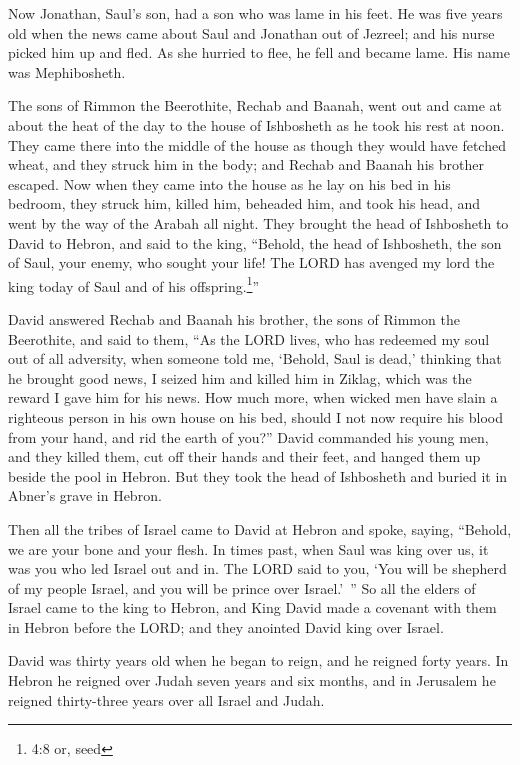 \myverse{}Now Jonathan, Saul’s son, had a son who was lame in his feet. He
was five years old when the news came about Saul and Jonathan out of Jezreel; and his nurse picked him
up and fled. As she hurried to flee, he fell and became lame. His name was Mephibosheth.

\myverse{}The sons of Rimmon the Beerothite, Rechab and Baanah, went out
and came at about the heat of the day to the house of Ishbosheth as he took his rest at noon.
\myverse{}They came there into the middle of the house as though they would have fetched
wheat, and they struck him in the body; and Rechab and Baanah his brother escaped.
\myverse{}Now when they came into the house as he lay on his bed in his bedroom, they
struck him, killed him, beheaded him, and took his head, and went by the way of the Arabah all night.
\myverse{}They brought the head of Ishbosheth to David to Hebron, and said to the king,
“Behold, the head of Ishbosheth, the son of Saul, your enemy, who sought your life! The LORD has avenged
my lord the king today of Saul and of his offspring.\footnote{4:8 or, seed}”

\myverse{}David answered Rechab and Baanah his brother, the sons of Rimmon
the Beerothite, and said to them, “As the LORD lives, who has redeemed my soul out of all adversity,
\myverse{}when someone told me, ‘Behold, Saul is dead,’ thinking that he brought good
news, I seized him and killed him in Ziklag, which was the reward I gave him for his news.
\myverse{}How much more, when wicked men have slain a righteous person in his own house
on his bed, should I not now require his blood from your hand, and rid the earth of you?”
\myverse{}David commanded his young men, and they killed them, cut off their hands and
their feet, and hanged them up beside the pool in Hebron. But they took the head of Ishbosheth and buried
it in Abner’s grave in Hebron.


\mychapter{} \myverse*{}Then all the tribes of Israel came to David at Hebron and spoke,
saying, “Behold, we are your bone and your flesh.
\myverse{}In times past, when Saul was king over us, it was you who led Israel out and
in. The LORD said to you, ‘You will be shepherd of my people Israel, and you will be prince over Israel.’ ”
\myverse{}So all the elders of Israel came to the king to Hebron, and King David made
a covenant with them in Hebron before the LORD; and they anointed David king over Israel.

\myverse{}David was thirty years old when he began to reign, and he reigned
forty years.
\myverse{}In Hebron he reigned over Judah seven years and six months, and in Jerusalem
he reigned thirty-three years over all Israel and Judah.

